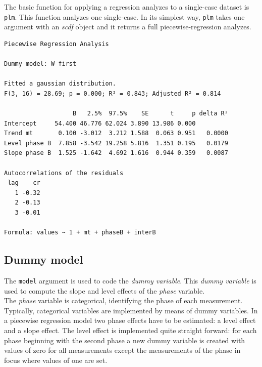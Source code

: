 \documentclass[
  letterpaper,
  DIV=11,
  numbers=noendperiod]{scrreprt}
\newenvironment{Shaded}{\begin{snugshade}}{\end{snugshade}}
\newcommand{\FunctionTok}[1]{\textcolor[rgb]{0.28,0.35,0.67}{#1}}
\newcommand{\NormalTok}[1]{\textcolor[rgb]{0.00,0.23,0.31}{#1}}
\newcommand{\SpecialCharTok}[1]{\textcolor[rgb]{0.37,0.37,0.37}{#1}}
\begin{document}
The basic function for applying a regression analyzes to a single-case
dataset is \texttt{plm}. This function analyzes one single-case. In its
simplest way, \texttt{plm} takes one argument with an \emph{scdf} object
and it returns a full piecewise-regression analyzes.

\begin{Shaded}
\end{Shaded}

\begin{verbatim}
Piecewise Regression Analysis

Dummy model: W first

Fitted a gaussian distribution.
F(3, 16) = 28.69; p = 0.000; R² = 0.843; Adjusted R² = 0.814

                   B   2.5%  97.5%    SE      t     p delta R²
Intercept     54.400 46.776 62.024 3.890 13.986 0.000         
Trend mt       0.100 -3.012  3.212 1.588  0.063 0.951   0.0000
Level phase B  7.858 -3.542 19.258 5.816  1.351 0.195   0.0179
Slope phase B  1.525 -1.642  4.692 1.616  0.944 0.359   0.0087

Autocorrelations of the residuals
 lag    cr
   1 -0.32
   2 -0.13
   3 -0.01

Formula: values ~ 1 + mt + phaseB + interB
\end{verbatim}

\hypertarget{dummy-model}{%
\subsection{Dummy model}\label{dummy-model}}

The \texttt{model} argument is used to code the \emph{dummy variable}.
This \emph{dummy variable} is used to compute the slope and level
effects of the \emph{phase} variable.\\
The \emph{phase} variable is categorical, identifying the phase of each
measurement. Typically, categorical variables are implemented by means
of dummy variables. In a piecewise regression model two phase effects
have to be estimated: a level effect and a slope effect. The level
effect is implemented quite straight forward: for each phase beginning
with the second phase a new dummy variable is created with values of
zero for all measurements except the measurements of the phase in focus
where values of one are set.
\end{document}
